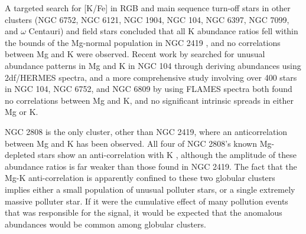 \documentclass[a4paper,fleqn,usenatbib]{mnras}
\begin{document}
A targeted search for [K/Fe] in RGB and main sequence turn-off stars in other clusters (NGC 6752, NGC 6121, NGC 1904, NGC 104, NGC 6397, NGC 7099, and $\omega$ Centauri) and field stars concluded that all K abundance ratios fell within the bounds of the Mg-normal population in NGC 2419 \citep{carretta2013}, and no correlations between Mg and K were observed. Recent work by \cite{cerniauskas201747tuc} searched for unusual abundance patterns in Mg and K in NGC 104 through deriving abundances using 2df/HERMES spectra, and a more comprehensive study involving over 400 stars in NGC 104, NGC 6752, and NGC 6809 by \cite{mucciarelli2017K} using FLAMES spectra \citep{cerniauskas201747tuc} both found no correlations between Mg and K, and no significant intrinsic spreads in either Mg or K.

NGC 2808 is the only cluster, other than NGC 2419, where an anticorrelation between Mg and K has been observed. All four of NGC 2808's known Mg-depleted stars show an anti-correlation with K \citep{mucciarelli2015}, although the amplitude of these abundance ratios is far weaker than those found in NGC 2419. The fact that the Mg-K anti-correlation is apparently confined to these two globular clusters implies either a small population of unusual polluter stars, or a single extremely massive polluter star. If it were the cumulative effect of many pollution events that was responsible for the signal, it would be expected that the anomalous abundances would be common among globular clusters.





\end{document}
